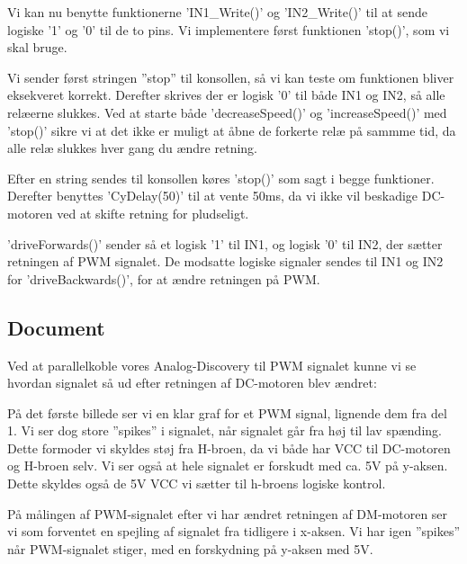 \documentclass[../main.tex]{subfiles}
\begin{document}

Vi kan nu benytte funktionerne ’IN1\_Write()’ og ’IN2\_Write()’ til at sende logiske ’1’ og ’0’ til de to pins. Vi implementere først funktionen ’stop()’, som vi skal bruge.


Vi sender først stringen ”stop” til konsollen, så vi kan teste om funktionen bliver eksekveret korrekt. Derefter skrives der er logisk ’0’ til både IN1 og IN2, så alle relæerne slukkes. Ved at starte både ’decreaseSpeed()’ og ’increaseSpeed()’ med ’stop()’ sikre vi at det ikke er muligt at åbne de forkerte relæ på sammme tid, da alle relæ slukkes hver gang du ændre retning.


Efter en string sendes til konsollen køres ’stop()’ som sagt i begge funktioner. Derefter benyttes ’CyDelay(50)’ til at vente 50ms, da vi ikke vil beskadige DC-motoren ved at skifte retning for pludseligt.
 
’driveForwards()’ sender så et logisk ’1’ til IN1, og logisk ’0’ til IN2, der sætter retningen af PWM signalet. De modsatte logiske signaler sendes til IN1 og IN2 for ’driveBackwards()’, for at ændre retningen på PWM.

\subsection{Document}
Ved at parallelkoble vores Analog-Discovery til PWM signalet kunne vi se hvordan signalet så ud efter retningen af DC-motoren blev ændret:


På det første billede ser vi en klar graf for et PWM signal, lignende dem fra del 1. Vi ser dog store ”spikes” i signalet, når signalet går fra høj til lav spænding. Dette formoder vi skyldes støj fra H-broen, da vi både har VCC til DC-motoren og H-broen selv. Vi ser også at hele signalet er forskudt med ca. 5V på y-aksen. Dette skyldes også de 5V VCC vi sætter til h-broens logiske kontrol.


På målingen af PWM-signalet efter vi har ændret retningen af DM-motoren ser vi som forventet en spejling af signalet fra tidligere i x-aksen. Vi har igen ”spikes” når PWM-signalet stiger, med en forskydning på y-aksen med 5V.
\end{document}
